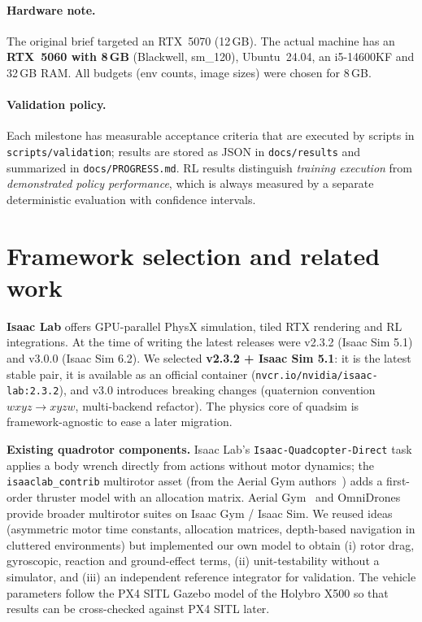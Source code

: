 \documentclass[11pt,a4paper]{article}
\begin{document}
\paragraph{Hardware note.} The original brief targeted an RTX~5070 (12\,GB). The actual machine has an
\textbf{RTX~5060 with 8\,GB} (Blackwell, sm\_120), Ubuntu~24.04, an i5-14600KF and 32\,GB RAM. All budgets
(env counts, image sizes) were chosen for 8\,GB.

\paragraph{Validation policy.} Each milestone has measurable acceptance criteria that are executed by scripts in
\texttt{scripts/validation}; results are stored as JSON in \texttt{docs/results} and summarized in
\texttt{docs/PROGRESS.md}. RL results distinguish \emph{training execution} from \emph{demonstrated policy
performance}, which is always measured by a separate deterministic evaluation with confidence intervals.

\section{Framework selection and related work}
\textbf{Isaac Lab} offers GPU-parallel PhysX simulation, tiled RTX rendering and RL integrations. At the time of
writing the latest releases were v2.3.2 (Isaac Sim 5.1) and v3.0.0 (Isaac Sim 6.2). We selected
\textbf{v2.3.2 + Isaac Sim 5.1}: it is the latest stable pair, it is available as an official container
(\texttt{nvcr.io/nvidia/isaac-lab:2.3.2}), and v3.0 introduces breaking changes (quaternion convention
$wxyz\!\to\!xyzw$, multi-backend refactor). The physics core of quadsim is framework-agnostic to ease a later
migration.

\textbf{Existing quadrotor components.} Isaac Lab's \texttt{Isaac-Quadcopter-Direct} task applies a body wrench
directly from actions without motor dynamics; the \texttt{isaaclab\_contrib} multirotor asset (from the Aerial
Gym authors~\cite{kulkarni2025aerialgym}) adds a first-order thruster model with an allocation matrix. Aerial
Gym~\cite{kulkarni2025aerialgym} and OmniDrones~\cite{xu2024omnidrones} provide broader multirotor suites on
Isaac Gym / Isaac Sim. We reused ideas (asymmetric motor time constants, allocation matrices, depth-based navigation
in cluttered environments) but implemented our own model to obtain (i) rotor drag, gyroscopic, reaction and
ground-effect terms, (ii) unit-testability without a simulator, and (iii) an independent reference integrator for
validation. The vehicle parameters follow the PX4 SITL Gazebo model of the Holybro X500 so that results can be
cross-checked against PX4 SITL later.
\end{document}
